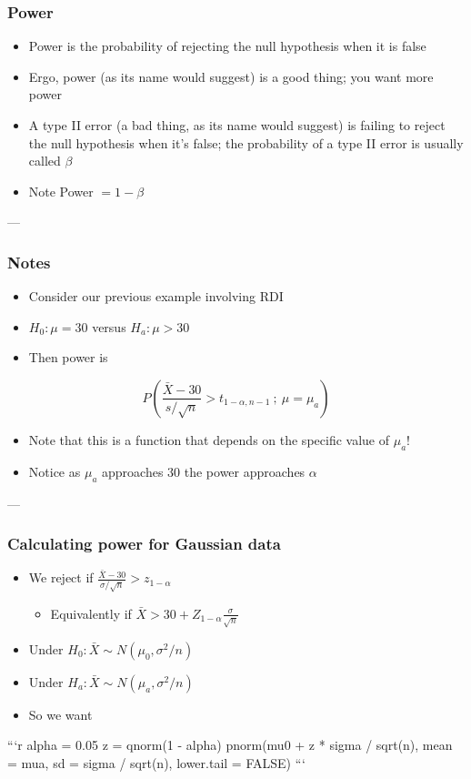 \documentclass[10pt,article]{article}
\begin{document}
\subsubsection{Power}
\label{sec:org6893978}
\begin{itemize}
\item Power is the probability of rejecting the null hypothesis when it is false
\item Ergo, power (as its name would suggest) is a good thing; you want more power
\item A type II error (a bad thing, as its name would suggest) is failing to reject the null hypothesis when it's false; the probability of a type II error is usually called \(\beta\)
\item Note Power  \(= 1 - \beta\)
\end{itemize}

---
\subsubsection{Notes}
\label{sec:org7e034d3}
\begin{itemize}
\item Consider our previous example involving RDI
\item \(H_0: \mu = 30\) versus \(H_a: \mu > 30\)
\item Then power is
\end{itemize}
$$P\left(\frac{\bar X - 30}{s /\sqrt{n}} > t_{1-\alpha,n-1} ~;~ \mu = \mu_a \right)$$
\begin{itemize}
\item Note that this is a function that depends on the specific value of \(\mu_a\)!
\item Notice as \(\mu_a\) approaches \(30\) the power approaches \(\alpha\)
\end{itemize}


---
\subsubsection{Calculating power for Gaussian data}
\label{sec:orga5b9e28}
\begin{itemize}
\item We reject if \(\frac{\bar X - 30}{\sigma /\sqrt{n}} > z_{1-\alpha}\)
\begin{itemize}
\item Equivalently if \(\bar X > 30 + Z_{1-\alpha} \frac{\sigma}{\sqrt{n}}\)
\end{itemize}
\item Under \(H_0 : \bar X \sim N(\mu_0, \sigma^2 / n)\)
\item Under \(H_a : \bar X \sim N(\mu_a, \sigma^2 / n)\)
\item So we want
\end{itemize}
```r
alpha = 0.05
z = qnorm(1 - alpha)
pnorm(mu0 + z * sigma / sqrt(n), mean = mua, sd = sigma / sqrt(n),
      lower.tail = FALSE)
```
\end{document}
